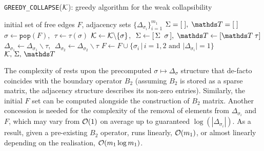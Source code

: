 \begin{algorithm}[h]
      \caption{ \texttt{GREEDY\_COLLAPSE}(\(\mathcal{K}\)):  greedy algorithm for the weak collapsibility
      \label{algo:greedy}}
      \begin{algorithmic}[1]
            \Require initial set of free edges \( F \), adjacency sets \(  \{ \Delta_{ \sigma_i } \}_{i=1}^{ m_1 } \)
             \State \( \Sigma = [ \; ] , \; \ds T = [ \; ] \) 
                  \State \( \sigma \gets \texttt{pop}( F ) \), \( \; \tau \gets \tau(\sigma)  \) 
                  \State \( \mathcal{K} \gets \mathcal{K} \backslash \{ \sigma \} \), \( \; \Sigma \gets [ \, \Sigma \;\; \sigma \, ] , \; \ds T \gets [ \ds T \; \tau ] \) 
                  \State \( \Delta_{\sigma_1} \gets \Delta_{\sigma_1} \backslash \tau  \), \( \; \Delta_{\sigma_2} \gets \Delta_{\sigma_2} \backslash \tau  \) 
                  \State \( F \gets F \cup \{ \sigma_i \, |  \, i = 1, 2 \text{ and } | \Delta_{\sigma_i} | = 1 \}  \) 
             \EndWhile
             \State \Return \( \mc K, \, \Sigma, \, \ds T \)
      \end{algorithmic}
\end{algorithm}

The complexity of  rests upon the precomputed \( \sigma \mapsto \Delta_\sigma \) structure that de-facto coincides with the boundary operator \( B_2 \) (assuming \( B_2 \) is stored as a sparse matrix, the adjacency structure describes its non-zero entries). Similarly, the initial \( F \) set can be computed alongside the construction of \( B_2 \) matrix. Another concession is needed for the complexity of the removal of elements from \( \Delta_{\sigma_i} \) and \( F \), which may vary from \( \mathcal{O} (1) \) on average up to guaranteed \( \log ( | \Delta_{\sigma_i} | ) \). As a result, given a pre-existing \( B_2 \) operator,  runs linearly, \( \mathcal{O} ( m_1  )\), or almost linearly depending on the realisation, \( \mathcal{O} ( m_1 \log m_1 )\).




